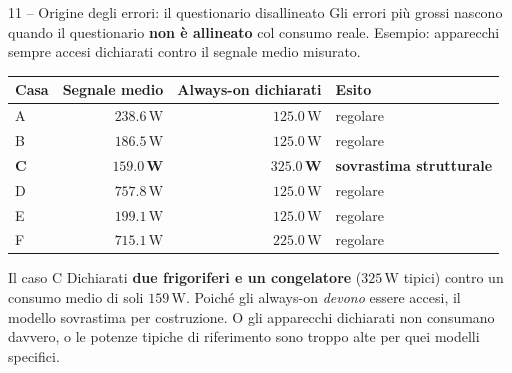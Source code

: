 \documentclass[aspectratio=169]{beamer}
\newcommand{\unit}[1]{\,\mathrm{#1}}
\begin{document}
\begin{frame}{11 -- Origine degli errori: il questionario disallineato}
  Gli errori pi\`u grossi nascono quando il questionario \textbf{non \`e allineato} col consumo reale.
  Esempio: apparecchi sempre accesi dichiarati contro il segnale medio misurato.
  \vspace{0.2em}
  \begin{center}\small
  \begin{tabular}{@{}l r r l@{}}
    \toprule
    \textbf{Casa} & \textbf{Segnale medio} & \textbf{Always-on dichiarati} & \textbf{Esito} \\
    \midrule
    A & $238.6\unit{W}$ & $125.0\unit{W}$ & regolare \\
    B & $186.5\unit{W}$ & $125.0\unit{W}$ & regolare \\
    \rowcolor{CorpLight}
    \textbf{C} & $\mathbf{159.0}\unit{\mathbf{W}}$ & $\mathbf{325.0}\unit{\mathbf{W}}$ & \textbf{\color{CorpRed}sovrastima strutturale} \\
    D & $757.8\unit{W}$ & $125.0\unit{W}$ & regolare \\
    E & $199.1\unit{W}$ & $125.0\unit{W}$ & regolare \\
    F & $715.1\unit{W}$ & $225.0\unit{W}$ & regolare \\
    \bottomrule
  \end{tabular}
  \end{center}

  \vspace{0.2em}
  \begin{alertblock}{Il caso C}
    \small
    Dichiarati \textbf{due frigoriferi e un congelatore} ($325\unit{W}$ tipici) contro un consumo
    medio di soli $159\unit{W}$. Poich\'e gli always-on \emph{devono} essere accesi, il modello
    sovrastima per costruzione. O gli apparecchi dichiarati non consumano davvero, o le potenze
    tipiche di riferimento sono troppo alte per quei modelli specifici.
  \end{alertblock}
\end{frame}
\end{document}
